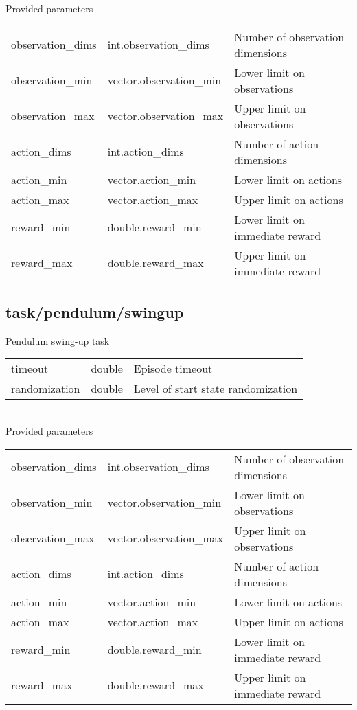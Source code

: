 \noindent Provided parameters\\

\noindent\begin{tabular}{@{}lll@{}}
observation\_dims&int.observation\_dims&Number of observation dimensions\\
observation\_min&vector.observation\_min&Lower limit on observations\\
observation\_max&vector.observation\_max&Upper limit on observations\\
action\_dims&int.action\_dims&Number of action dimensions\\
action\_min&vector.action\_min&Lower limit on actions\\
action\_max&vector.action\_max&Upper limit on actions\\
reward\_min&double.reward\_min&Lower limit on immediate reward\\
reward\_max&double.reward\_max&Upper limit on immediate reward\\
\end{tabular}
\subsection{task/pendulum/swingup}
\noindent Pendulum swing-up task\\

\noindent\begin{tabular}{@{}lll@{}}
timeout&double&Episode timeout\\
randomization&double&Level of start state randomization\\
\end{tabular}
\\

\noindent Provided parameters\\

\noindent\begin{tabular}{@{}lll@{}}
observation\_dims&int.observation\_dims&Number of observation dimensions\\
observation\_min&vector.observation\_min&Lower limit on observations\\
observation\_max&vector.observation\_max&Upper limit on observations\\
action\_dims&int.action\_dims&Number of action dimensions\\
action\_min&vector.action\_min&Lower limit on actions\\
action\_max&vector.action\_max&Upper limit on actions\\
reward\_min&double.reward\_min&Lower limit on immediate reward\\
reward\_max&double.reward\_max&Upper limit on immediate reward\\
\end{tabular}
